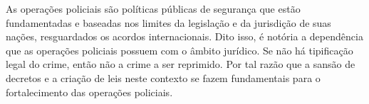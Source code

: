 As operações policiais são políticas públicas de segurança que estão fundamentadas e baseadas nos limites da legislação e da jurisdição de suas nações, resguardados os acordos internacionais. Dito isso, é notória a dependência que as operações policiais possuem com o âmbito jurídico. Se não há tipificação legal do crime, então não a crime a ser reprimido. Por tal razão que a sansão de decretos e a criação de leis neste contexto se fazem fundamentais para o fortalecimento das operações policiais. 













